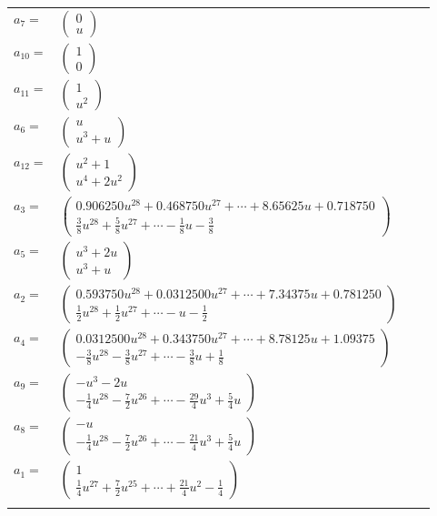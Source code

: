 \documentclass[1p]{elsarticle_modified}
\theoremstyle{definition}
\begin{document}
\begin{tabular}{m{7pt} m{180pt} m{7pt} m{180pt} }
\flushright $a_{7}=$&$\begin{pmatrix}0\\u\end{pmatrix}$ \\
\flushright $a_{10}=$&$\begin{pmatrix}1\\0\end{pmatrix}$ \\
\flushright $a_{11}=$&$\begin{pmatrix}1\\u^2\end{pmatrix}$ \\
\flushright $a_{6}=$&$\begin{pmatrix}u\\u^3+u\end{pmatrix}$ \\
\flushright $a_{12}=$&$\begin{pmatrix}u^2+1\\u^4+2 u^2\end{pmatrix}$ \\
\flushright $a_{3}=$&$\begin{pmatrix}0.906250 u^{28}+0.468750 u^{27}+\cdots+8.65625 u+0.718750\\\frac{3}{8} u^{28}+\frac{5}{8} u^{27}+\cdots-\frac{1}{8} u-\frac{3}{8}\end{pmatrix}$ \\
\flushright $a_{5}=$&$\begin{pmatrix}u^3+2 u\\u^3+u\end{pmatrix}$ \\
\flushright $a_{2}=$&$\begin{pmatrix}0.593750 u^{28}+0.0312500 u^{27}+\cdots+7.34375 u+0.781250\\\frac{1}{2} u^{28}+\frac{1}{2} u^{27}+\cdots- u-\frac{1}{2}\end{pmatrix}$ \\
\flushright $a_{4}=$&$\begin{pmatrix}0.0312500 u^{28}+0.343750 u^{27}+\cdots+8.78125 u+1.09375\\-\frac{3}{8} u^{28}-\frac{3}{8} u^{27}+\cdots-\frac{3}{8} u+\frac{1}{8}\end{pmatrix}$ \\
\flushright $a_{9}=$&$\begin{pmatrix}- u^3-2 u\\-\frac{1}{4} u^{28}-\frac{7}{2} u^{26}+\cdots-\frac{29}{4} u^3+\frac{5}{4} u\end{pmatrix}$ \\
\flushright $a_{8}=$&$\begin{pmatrix}- u\\-\frac{1}{4} u^{28}-\frac{7}{2} u^{26}+\cdots-\frac{21}{4} u^3+\frac{5}{4} u\end{pmatrix}$ \\
\flushright $a_{1}=$&$\begin{pmatrix}1\\\frac{1}{4} u^{27}+\frac{7}{2} u^{25}+\cdots+\frac{21}{4} u^2-\frac{1}{4}\end{pmatrix}$\\&\end{tabular}
\end{document}
